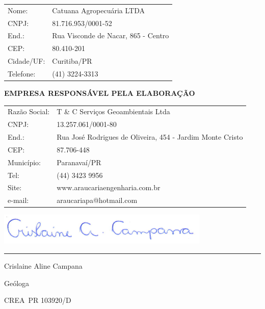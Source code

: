 \begin{tabular}{p{4cm} p{11cm}}
	Nome: & Catuana Agropecuária LTDA\\
	CNPJ: & 81.716.953/0001-52\\
	End.: & Rua Visconde de Nacar, 865 - Centro\\
	CEP:  & 80.410-201\\
	Cidade/UF:  & Curitiba/PR\\
	Telefone: & (41) 3224-3313\\
\end{tabular}
\vfill

\textbf{EMPRESA RESPONSÁVEL PELA ELABORAÇÃO}\\


\begin{tabular}{p{4cm} p{11cm}}
	Razão Social: & T \& C Serviços Geoambientais Ltda\\
	CNPJ: & 13.257.061/0001-80\\ %
	End.: & Rua José Rodrigues de Oliveira, 454 - Jardim Monte Cristo\\
	CEP: & 87.706-448\\
	Município: & Paranavaí/PR  \\
	Tel: & (44) 3423 9956  \\
	Site: &  www.araucariaengenharia.com.br\\
	e-mail: & araucariapa@hotmail.com \\
\end{tabular}
\vfill


\begin{minipage}[b]{0.49\textwidth}
	
	
	\includegraphics[width=\textwidth]{./imagens/assinatura digital.png}
	\vspace{-40pt}
	
	\rule{8cm}{1pt}
	
	Crislaine Aline Campana 
	
	Geóloga
	
	CREA\textendash~PR 103920/D\\
	
	
\end{minipage}


